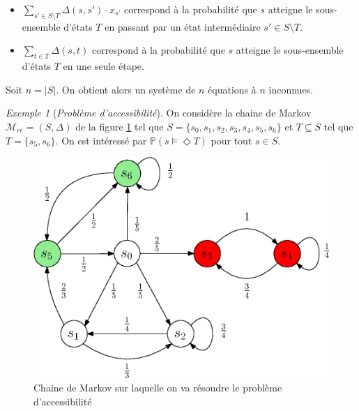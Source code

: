 \documentclass[12pt,a4paper]{report}
\theoremstyle{definition}%
\theoremstyle{remark}
\newtheorem{example}{Exemple}[chapter]
\let\labelitemi\labelitemii
\begin{document}
\begin{itemize}
\renewcommand{\labelitemi}{\tiny$\bullet$}
	\item $ \sum_{s' \in S \setminus T}  \Delta(s, s') \cdot x_{s'} $ correspond à la probabilité que $s$ atteigne le sous-ensemble d'états $T$ en passant par un état intermédiaire $s' \in S \setminus T$.
	\item $\sum_{t \in T} \Delta(s, t)$ correspond à la probabilité que $s$ atteigne le sous-ensemble d'états $T$ en une seule étape.
\end{itemize}
Soit $n = |S|$. On obtient alors un système de $n$ équations à $n$ inconnues.

\begin{example}[\textit{Problème d'accessibilité}]\label{reachex}
	On considère la chaine de Markov $\mathcal{M}_{re} = (S, \Delta)$ de la figure \ref{reachability-example} tel que $S = \{s_0, s_1, s_2, s_3, s_4, s_5, s_6\}$ et $T \subseteq S$ tel que $T = \{ s_5, s_6 \}$. On est intéressé par $\mathbb{P}(s \models \Diamond T)$ pour tout $s \in S$.
	\begin{figure}[H]
	\centering
	\includegraphics[scale=0.7]{figures/reachability-example.eps}
	\caption{Chaine de Markov sur laquelle on va résoudre le problème d'accessibilité}
	\label{reachability-example}
	\end{figure}


\end{example}
\end{document}
